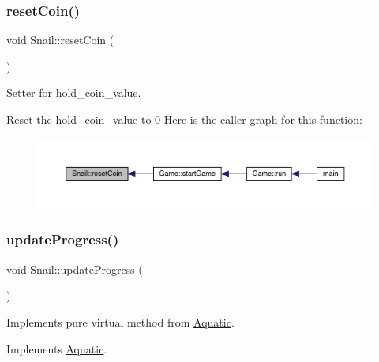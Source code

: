 \subsubsection{\texorpdfstring{reset\+Coin()}{resetCoin()}}
{\footnotesize\ttfamily void Snail\+::reset\+Coin (\begin{DoxyParamCaption}{ }\end{DoxyParamCaption})}



Setter for hold\+\_\+coin\+\_\+value. 

Reset the hold\+\_\+coin\+\_\+value to 0 Here is the caller graph for this function\+:\nopagebreak
\begin{figure}[H]
\begin{center}
\leavevmode
\includegraphics[width=350pt]{class_snail_a21ebc352e8884cd36a1733aafb731944_icgraph}
\end{center}
\end{figure}
\mbox{\label{class_snail_a327c2d31017320c4cd18b48103905fa7}} 
\subsubsection{\texorpdfstring{update\+Progress()}{updateProgress()}}
{\footnotesize\ttfamily void Snail\+::update\+Progress (\begin{DoxyParamCaption}{ }\end{DoxyParamCaption})\hspace{0.3cm}{\ttfamily [virtual]}}



Implements pure virtual method from \mbox{\hyperlink{class_aquatic}{Aquatic}}. 



Implements \mbox{\hyperlink{class_aquatic_ae1b6301ed27d6aadb73c7ee7879c24af}{Aquatic}}.

